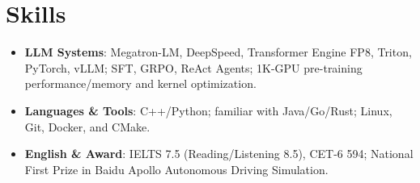 \documentclass{resume}
\begin{document}
\section{Skills}
\begin{itemize}[parsep=0.25ex]
  \item \textbf{LLM Systems}: Megatron-LM, DeepSpeed, Transformer Engine FP8, Triton, PyTorch, vLLM; SFT, GRPO, ReAct Agents; 1K-GPU pre-training performance/memory and kernel optimization.
  \item \textbf{Languages \& Tools}: C++/Python; familiar with Java/Go/Rust; Linux, Git, Docker, and CMake.
  \item \textbf{English \& Award}: IELTS 7.5 (Reading/Listening 8.5), CET-6 594; National First Prize in Baidu Apollo Autonomous Driving Simulation.
\end{itemize}
\end{document}

